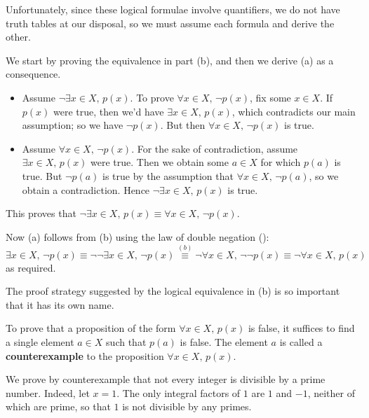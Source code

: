 \begin{cproof}
Unfortunately, since these logical formulae involve quantifiers, we do not have truth tables at our disposal, so we must assume each formula and derive the other.

We start by proving the equivalence in part (b), and then we derive (a) as a consequence.

\begin{itemize}
\item Assume $\neg \exists x \in X,\, p(x)$. To prove $\forall x \in X,\, \neg p(x)$, fix some $x \in X$. If $p(x)$ were true, then we'd have $\exists x \in X,\, p(x)$, which contradicts our main assumption; so we have $\neg p(x)$. But then $\forall x \in X,\, \neg p(x)$ is true.

\item Assume $\forall x \in X,\, \neg p(x)$. For the sake of contradiction, assume $\exists x \in X,\, p(x)$ were true. Then we obtain some $a \in X$ for which $p(a)$ is true. But $\neg p(a)$ is true by the assumption that $\forall x \in X,\, \neg p(a)$, so we obtain a contradiction. Hence $\neg \exists x \in X,\, p(x)$ is true.
\end{itemize}

This proves that $\neg \exists x \in X,\, p(x) \equiv \forall x \in X,\, \neg p(x)$.

Now (a) follows from (b) using the law of double negation ():
\[ \exists x \in X,\, \neg p(x) \equiv \neg\neg \exists x \in X,\, \neg p(x) \overset{(b)}{\equiv} \neg \forall x \in X,\, \neg \neg p(x) \equiv \neg \forall x \in X,\, p(x)\]
as required.
\end{cproof}

The proof strategy suggested by the logical equivalence in (b) is so important that it has its own name.

\begin{strategy}
\label{strCounterexample}
To prove that a proposition of the form $\forall x \in X,\, p(x)$ is false, it suffices to find a single element $a \in X$ such that $p(a)$ is false. The element $a$ is called a \textbf{counterexample} to the proposition $\forall x \in X,\, p(x)$.
\end{strategy}

\begin{example}
We prove by counterexample that not every integer is divisible by a prime number. Indeed, let $x = 1$. The only integral factors of $1$ are $1$ and $-1$, neither of which are prime, so that $1$ is not divisible by any primes.
\end{example}

